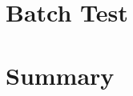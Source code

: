 \documentclass[11pt,a4paper]{article}
\begin{document}
    



\section{Batch Test}
\section{Summary}
\end{document}
